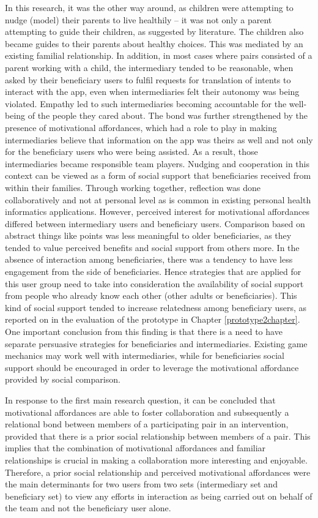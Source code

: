 In this research, it was the other way around, as children were attempting to nudge (model) their parents to live healthily -- it was not only a parent attempting to guide their children, as suggested by literature. The children also became guides to their parents about healthy choices. This was mediated by an existing familial relationship. In addition, in most cases where pairs consisted of a parent working with a child, the intermediary tended to be reasonable, when asked by their beneficiary users to fulfil requests for translation of intents to interact with the app, even when intermediaries felt their autonomy was being violated. Empathy led to such intermediaries becoming accountable for the well-being of the people they cared about. The bond was further strengthened by the presence of motivational affordances, which had a role to play in making intermediaries believe that information on the app was theirs as well and not only for the beneficiary users who were being assisted. As a result, those intermediaries became responsible team players. Nudging and cooperation in this context can be viewed as a form of social support that beneficiaries received from within their families. Through working together, reflection was done collaboratively and not at personal level as is common in existing personal health informatics applications.  However, perceived interest for motivational affordances differed between intermediary users and beneficiary users. Comparison based on abstract things like points was less meaningful to older beneficiaries, as they tended to value perceived benefits and social support from others more. In the absence of interaction among beneficiaries, there was a tendency to have less engagement from the side of beneficiaries. Hence strategies that are applied for this user group need to take into consideration the availability of social support from people who already know each other (other adults or beneficiaries). This kind of social support tended to increase relatedness among beneficiary users, as reported on in the evaluation of the prototype in Chapter \ref{prototype2chapter}. One important conclusion from this finding is that there is a need to have separate persuasive strategies for beneficiaries and intermediaries. Existing game mechanics may work well with intermediaries, while for beneficiaries social support should be encouraged in order to leverage the motivational affordance provided by social comparison.

In response to the first main research question, it can be concluded that motivational affordances are able to foster collaboration and subsequently a relational bond between members of a participating pair in an intervention, provided that there is a prior social relationship between members of a pair. This implies that the combination of motivational affordances and familiar relationships is crucial in making a collaboration more interesting and enjoyable. Therefore, a prior social relationship and perceived motivational affordances were the main determinants for two users from two sets (intermediary set and beneficiary set) to view any efforts in interaction as being carried out on behalf of the team and not the beneficiary user alone.  

